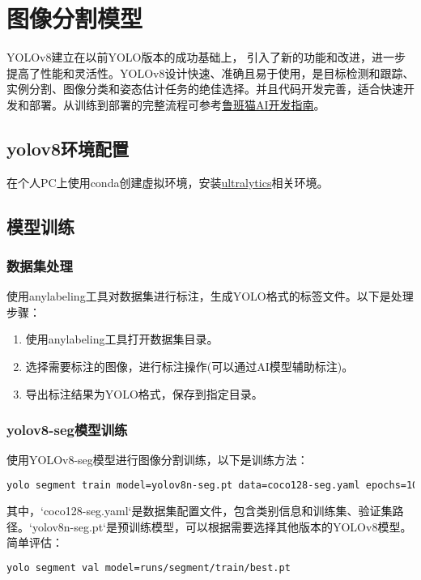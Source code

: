 \chapter{图像分割模型}
YOLOv8建立在以前YOLO版本的成功基础上， 引入了新的功能和改进，进一步提高了性能和灵活性。YOLOv8设计快速、准确且易于使用，是目标检测和跟踪、实例分割、图像分类和姿态估计任务的绝佳选择。并且代码开发完善，适合快速开发和部署。从训练到部署的完整流程可参考\href{https://doc.embedfire.com/linux/rk356x/Ai/zh/latest/lubancat_ai/example/yolov8.html}{鲁班猫AI开发指南}。
\section{yolov8环境配置}
在个人PC上使用conda创建虚拟环境，安装\href{https://github.com/ultralytics/ultralytics}{ultralytics}相关环境。
\section{模型训练}

\subsection{数据集处理}
使用anylabeling工具对数据集进行标注，生成YOLO格式的标签文件。以下是处理步骤：
\begin{enumerate}
    \item 使用anylabeling工具打开数据集目录。
    \item 选择需要标注的图像，进行标注操作(可以通过AI模型辅助标注)。
    \item 导出标注结果为YOLO格式，保存到指定目录。
\end{enumerate}
\subsection{yolov8-seg模型训练}
使用YOLOv8-seg模型进行图像分割训练，以下是训练方法：
\begin{lstlisting}[language=bash, basicstyle=\ttfamily\small, keywordstyle=\color{blue}, breaklines=true]
yolo segment train model=yolov8n-seg.pt data=coco128-seg.yaml epochs=100 imgsz=640
\end{lstlisting}
其中，`coco128-seg.yaml`是数据集配置文件，包含类别信息和训练集、验证集路径。`yolov8n-seg.pt`是预训练模型，可以根据需要选择其他版本的YOLOv8模型。
简单评估：
\begin{lstlisting}[language=bash, basicstyle=\ttfamily\small, keywordstyle=\color{blue}, breaklines=true]
yolo segment val model=runs/segment/train/best.pt
\end{lstlisting}
